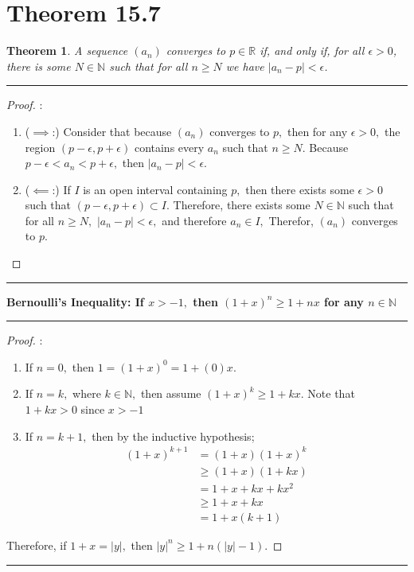 \documentclass[openany, amssymb, psamsfonts]{amsart}
\newcommand{\bbN}{\mathbb{N}}
\newcommand{\bbR}{\mathbb{R}}
\newcommand{\abs}[1]{\lvert #1 \rvert}
\newtheorem{thm}{Theorem}[section]
\theoremstyle{definition}
\numberwithin{equation}{section}
\begin{document}
\section*{Theorem 15.7}
\begin{thm}
	\label{15.7}
	A sequence $(a_n)$ converges to $p\in\bbR$ if, and only if, for all $\epsilon>0$, there is some $N\in\bbN$ such that for all $n \geq N$ we have $\abs{a_n - p} < \epsilon$. 
\end{thm}
\vspace{4pt}     \hrule   \vspace{4pt}\begin{proof}:\\
\begin{enumerate}
    \item ($\implies$:) Consider that because $(a_n)$ converges to $p,$ then for any $\epsilon>0,$ the region $(p-\epsilon, p+ \epsilon)$ contains every $a_n$ such that $n\geq N.$ Because $p-\epsilon< a_n < p + \epsilon,$ then $|a_n - p|< \epsilon.$
    \item ($\impliedby$:) If $I$ is an open interval containing $p,$ then there exists some $\epsilon>0$ such that $(p- \epsilon, p+ \epsilon)\subset I.$ Therefore, there exists some $N \in \bbN$ such that for all $n\geq N,$ $|a_n - p|< \epsilon,$ and therefore $a_n \in I,$ Therefor, $(a_n)$ converges to $p.$
\end{enumerate}
\end{proof}      \vspace{4pt}     \hrule   \vspace{4pt}

\textbf{Bernoulli's Inequality: If $x>-1,$ then $(1 + x)^n \geq 1 + nx$ for any $n \in \bbN$}
\vspace{4pt}     \hrule   \vspace{4pt}\begin{proof}:\\
\begin{enumerate}
\item If $n = 0,$ then $1=(1+x)^0 = 1 + (0)x.$ 
\item If $n =k,$ where $k\in \bbN,$ then assume $(1+x)^k \geq 1 + kx.$ Note that $1+kx> 0$ since $x>-1$
\item If $n = k+1,$ then by the inductive hypothesis;
\begin{align*}
(1+x)^{k+1} &= (1+x)(1+x)^k\\
&\geq (1+x)(1+kx)\\
&= 1 + x + kx + kx^2\\
\tag{$kx^2\geq 0$}&\geq 1 + x + kx\\
&= 1 + x(k+1)
\end{align*}
\end{enumerate}
Therefore, if $1+x = |y|,$ then $|y|^n \geq 1 + n(|y|-1).$
\end{proof}\vspace{4pt}     \hrule   \vspace{4pt}
\end{document}
